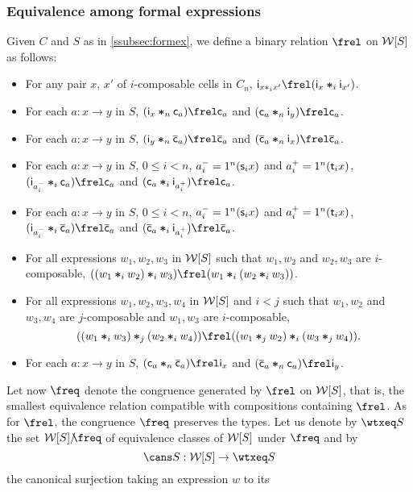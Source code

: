  \subsubsection{Equivalence among formal
   expressions}\label{ssubsec:eqform}
Given $C$ and $S$ as in \ref{ssubsec:formex},  we define a
binary relation $\frel$ on $\mathcal{W}[S]$ as follows:
\begin{itemize}
\item For any pair $x$, $x'$ of $i$-composable cells in $C_n$,
  $\fid{x\comp i x'}\frel (\fid{x}\fcomp i\fid{x'})$.
\item For each $a:x\to y$ in $S$, $(\fid{x}\fcomp{n}\fcst{a})\frel
  \fcst{a}$ and $(\fcst a\fcomp{n} \fid{y})\frel \fcst a$.
 \item For each $a:x\to y$ in $S$, $(\fid{y}\fcomp{n}\finv{a})\frel
   \finv{a}$ and $(\finv a\fcomp{n} \fid{x})\frel \finv a$.
\item For each $a:x\to y$ in $S$, $0\leq i< n$, $a_i^{-}=1^{n}(\mathsf{s}_{i}
  x)$ and $a_i^{+}=1^{n}(\mathsf{t}_{i} x)$, $(\fid{a_i^{-}}\fcomp{i}\fcst{a})\frel
  \fcst{a}$ and $(\fcst a\fcomp{i} \fid{a_i^+})\frel \fcst a$.
\item For each $a:x\to y$ in $S$, $0\leq i< n$, $a_i^{-}=1^{n}(\mathsf{s}_{i}
  x)$ and $a_i^{+}=1^{n}(\mathsf{t}_{i} x)$, $(\fid{a_i^{-}}\fcomp{i}\finv{a})\frel
  \finv{a}$ and $(\finv a\fcomp{i} \fid{a_i^+})\frel \finv a$.  
 \item For all expressions $w_1,w_2,w_3$ in $\mathcal{W}[S]$ such that $w_1,w_2$ and
   $w_2,w_3$ are $i$-composable, $((w_1\fcomp i w_2)\fcomp i w_3)\frel
   (w_1\fcomp i(w_2\fcomp i w_3))$.
 \item For all expressions $w_1,w_2,w_3,w_4$ in $\mathcal{W}[S]$ and $i<j$
   such that $w_1,w_2$ and $w_3,w_4$ are
   $j$-composable and $w_1,w_3$ are $i$-composable,
   \[
     ((w_1\fcomp i w_3)\fcomp j (w_2\fcomp i w_4))\frel ((w_1\fcomp j
     w_2)\fcomp i (w_3\fcomp j w_4)).
   \]
  \item For each $a:x\to y$ in $S$, $(\fcst a\fcomp n\finv a)\frel
    \fid{x}$ and $(\finv a\fcomp n\fcst a)\frel \fid y$. 
  \end{itemize}
  Let now $\freq$ denote the congruence generated by
  $\frel$ on $\mathcal{W}[S]$, that is, the smallest equivalence relation
  compatible with compositions containing $\frel$. As for $\frel$, the
  congruence $\freq$ preserves the types. Let us denote by $\wtxeq S$
  the set $\wtx S/\!\!\freq$ of equivalence classes of $\mathcal{W}[S]$ under
  $\freq$ and by
  \[\cans S: \wtx S\to \wtxeq S\]
  the canonical surjection taking an expression $w$ to its
